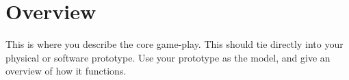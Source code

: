 \section{Overview} %
This is where you describe the core game-play. This should tie directly into
your physical or software prototype. Use your prototype as the model, and give
an overview of how it functions.